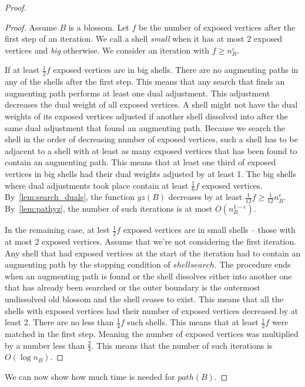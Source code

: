 \begin{proof}
\begin{proof}
    Assume $B$ is a blossom. Let $f$ be the number of exposed vertices after the first step of an iteration. We call a shell \textit{small} when it has at most $2$ exposed vertices and \textit{big} otherwise. We consider an iteration with $f \geq n_B^\varepsilon$.

    If at least $\frac{1}{2}f$ exposed vertices are in big shells. There are no augmenting paths in any of the shells after the first step. This means that any search that finds an augmenting path performs at least one dual adjustment. This adjustment decreases the dual weight of all exposed vertices. A shell might not have the dual weights of its exposed vertices adjusted if another shell dissolved into after the same dual adjustment that found an augmenting path. Because we search the shell in the order of decreasing number of exposed vertices, such a shell has to be adjacent to a shell with at least as many exposed vertices that has been found to contain an augmenting path. This means that at least one third of exposed vertices in big shells had their dual weights adjusted by at least 1. The big shells where dual adjustments took place contain at least $\frac{1}{6}f$ exposed vertices. By~\ref{lem:search_duals}, the function $yz(B)$ decreases by at least $\frac{1}{12}f \geq \frac{1}{12}n_B^e$. By~\ref{lem:pathyz}, the number of such iterations is at most $O(n_B^{1-e})$.

    In the remaining case, at lest $\frac{1}{2}f$ exposed vertices are in small shells – those with at most 2 exposed vertices. Assume that we're not considering the first iteration. Any shell that had exposed vertices at the start of the iteration had to contain an augmenting path by the stopping condition of $shellsearch$. The procedure ends when an augmenting path is found or the shell dissolves either into another one that has already been searched or the outer boundary is the outermost undissolved old blossom and the shell ceases to exist. This means that all the shells with exposed vertices had their number of exposed vertices decreased by at least 2. There are no less than $\frac{1}{4}f$ such shells. This means that at least $\frac{1}{2}f$ were matched in the first step. Meaning the number of exposed vertices was multiplied by a number less than $\frac{2}{3}$. This means that the number of such iterations is $O(\log n_B)$.
\end{proof}

We can now show how much time is needed for $path(B)$.


\end{proof}
